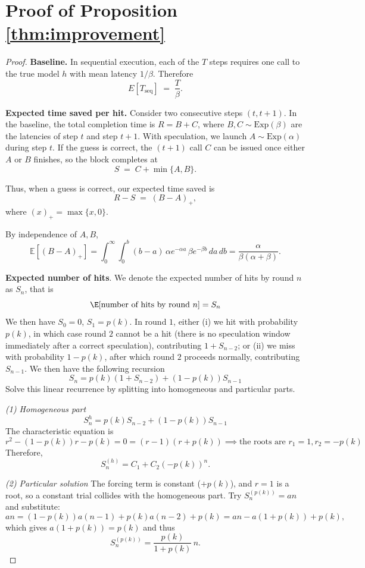 \newpage
\section{Proof of Proposition \ref{thm:improvement}}
\label{app:proof}
\begin{proof}
\textbf{Baseline.}  
In sequential execution, each of the $T$ steps requires one call to the true model $h$ with mean latency $1/\beta$. Therefore
\[
E[T_{\mathrm{seq}}] \;=\; \frac{T}{\beta}.
\]

\medskip
\textbf{Expected time saved per hit.}  
Consider two consecutive steps $(t,t{+}1)$. In the baseline, the total completion time is $R = B + C$, where $B,C \sim \mathrm{Exp}(\beta)$ are the latencies of step $t$ and step $t{+}1$. With speculation, we launch $A \sim \mathrm{Exp}(\alpha)$ during step $t$. If the guess is correct, the $(t{+}1)$ call $C$ can be issued once either $A$ or $B$ finishes, so the block completes at
\[
S \;=\; C + \min\{A,B\}.
\]

Thus, when a guess is correct, our expected time saved is
\[
R - S \;=\; (B-A)_+,
\]
where $(x)_+ = \max\{x,0\}$.
  
By independence of $A,B$,
\[
\mathbb{E}[(B-A)_+]
= \int_{0}^{\infty}\!\int_{0}^{b} (b-a)\,\alpha e^{-\alpha a}\,\beta e^{-\beta b}\,da\,db
= \frac{\alpha}{\beta(\alpha+\beta)}.
\]

\medskip
\textbf{Expected number of hits}. We denote the expected number of hits by round $n$ as $S_n$, that is
$$\E[\text{number of hits by round }n] = S_n$$
We then have $S_0=0$, $S_1 = p(k)$. In round $1$, either (i) we hit with probability $p(k)$, in which case round $2$ cannot be a hit (there is no speculation window immediately after a correct speculation), contributing $1+S_{n-2}$; or (ii) we miss with probability $1-p(k)$, after which round $2$ proceeds normally, contributing $S_{n-1}$. We then have the following recursion
$$S_n = p(k)(1+S_{n-2}) + (1-p(k))S_{n-1}$$
Solve this linear recurrence by splitting into homogeneous and particular parts.

\textit{(1) Homogeneous part}
\[S_n^{h} = p(k)S_{n-2}+ (1-p(k))S_{n-1}\]
The characteristic equation is
\[
r^2-(1-p(k))r-p(k)=0=(r-1)(r+p(k)) \implies \text{the roots are }r_1=1, r_2=-p(k)
\]
Therefore,
\[
S_n^{(h)}=C_1 + C_2(-p(k))^n.
\]

\textit{(2) Particular solution}
The forcing term is constant ($+p(k)$), and $r=1$ is a root, so a constant trial collides with the homogeneous part. Try $S_n^{(p(k))}=an$ and substitute:
\[
an=(1-p(k))a(n-1)+p(k)a(n-2)+p(k)
= an - a(1+p(k)) + p(k),
\]
which gives $a(1+p(k))=p(k)$ and thus
\[
S_n^{(p(k))}=\frac{p(k)}{1+p(k)}\,n.
\]


\end{proof}
